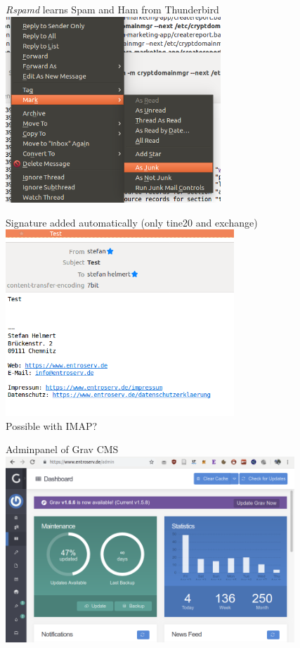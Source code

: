 \documentclass{beamer}
\begin{document}
\begin{frame}[fragile]{\insertsection}{\insertsubsection}
	\emph{Rspamd} learns Spam and Ham from Thunderbird
	\includegraphics[height=7cm]{TBlearn.png}\\
\end{frame}	

\begin{frame}[fragile]{\insertsection}{\insertsubsection}
	Signature added automatically (only tine20 and exchange)
	\includegraphics[height=7cm]{signature.png}\\
	Possible with IMAP?
\end{frame}

\begin{frame}[fragile]{\insertsection}{\insertsubsection}
	Adminpanel of Grav CMS
	\includegraphics[height=7cm]{Grav.png}\\
\end{frame}
\end{document}
